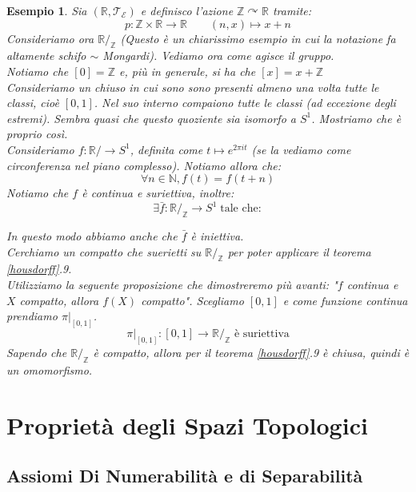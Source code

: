\documentclass[11pt,a4paper,twoside]{article}
\newtheorem{es}{Esempio}
\theoremstyle{definition}
\begin{document}
\begin{es}
	Sia $(\mathbb R, \mathcal T_\mathcal E)$ e definisco l'azione $\mathbb Z \curvearrowright \mathbb R$ tramite:
	\[ p:\mathbb Z \times \mathbb R \to \mathbb R \qquad (n, x)\mapsto x + n \]
	Consideriamo ora $\mathbb R/_\mathbb Z$ (\textit{Questo è un chiarissimo esempio in cui la notazione fa altamente schifo} $\sim$ Mongardi). Vediamo ora come agisce il gruppo.\\
	Notiamo che $[0] = \mathbb Z$ e, più in generale, si ha che $[x] = x + \mathbb Z$\\
	Consideriamo un chiuso in cui sono sono presenti almeno una volta tutte le classi, cioè $[0,1]$. Nel suo interno compaiono tutte le classi (ad eccezione degli estremi). Sembra quasi che questo quoziente sia isomorfo a $S^1$. Mostriamo che è proprio così.\\
	Consideriamo $f:\mathbb R/ \to S^1$, definita come $t \mapsto e^{2\pi i t}$ (se la vediamo come circonferenza nel piano complesso). Notiamo allora che:
	\[ \forall n \in \mathbb N, f(t) = f(t+n) \]
	Notiamo che $f$ è continua e suriettiva, inoltre:
	\[\exists \bar f : \mathbb R/_\mathbb Z \to S^1 \; \text{tale che}:\]
	\begin{center}
	\end{center}
	In questo modo abbiamo anche che $\bar f$ è iniettiva.\\
	Cerchiamo un compatto che suerietti su $\mathbb R/_\mathbb Z$ per poter applicare il teorema \ref{housdorff}.9.\\
	Utilizziamo la seguente proposizione che dimostreremo più avanti: "$f$ continua e $X$ compatto, allora $f(X)$ compatto". Scegliamo $[0,1]$ e come funzione continua prendiamo $\pi|_{[0,1]}$.
	\[ \pi|_{[0,1]}:[0,1] \to \mathbb R/_\mathbb Z \text{ è suriettiva}\]
	Sapendo che $\mathbb R/_\mathbb Z$ è compatto, allora per il teorema \ref{housdorff}.9 è chiusa, quindi è un omomorfismo.
\end{es}

\newpage

\section{Proprietà degli Spazi Topologici}

\subsection{Assiomi Di Numerabilità e di Separabilità}
\end{document}
